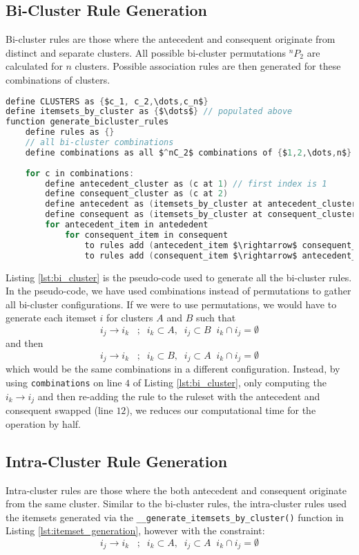 \subsection{Bi-Cluster Rule Generation}
Bi-cluster rules are those where the antecedent and consequent originate from distinct and separate clusters. All possible bi-cluster permutations $^nP_2$ are calculated for $n$ clusters. Possible association rules are then generated for these combinations of clusters.
\begin{lstlisting}[language=C, mathescape=true, caption=Cluster Itemset Generation, label=lst:bi_cluster]
define CLUSTERS as {$c_1, c_2,\dots,c_n$}
define itemsets_by_cluster as {$\dots$} // populated above
function generate_bicluster_rules
    define rules as {}
    // all bi-cluster combinations
    define combinations as all $^nC_2$ combinations of {$1,2,\dots,n$} with 2 elements
    
    for c in combinations:
        define antecedent_cluster as (c at 1) // first index is 1
        define consequent_cluster as (c at 2)
        define antecedent as (itemsets_by_cluster at antecedent_cluster)
        define consequent as (itemsets_by_cluster at consequent_cluster)
        for antecedent_item in antededent
            for consequent_item in consequent
                to rules add (antecedent_item $\rightarrow$ consequent_item)
                to rules add (consequent_item $\rightarrow$ antecedent_item)
\end{lstlisting}
Listing \ref{lst:bi_cluster} is the pseudo-code used to generate all the bi-cluster rules. In the pseudo-code, we have used combinations instead of permutations to gather all bi-cluster configurations. 
If we were to use permutations, we would have to generate each itemset $i$ for clusters $A$ and $B$ such that
	\[i_j \rightarrow i_k\;\;\;;\;\;i_k \subset A,\;\; i_j \subset B\;\; i_k \cap i_j = \emptyset\]
and then
	\[i_j \rightarrow i_k\;\;\;;\;\;i_k \subset B,\;\; i_j \subset A\;\; i_k \cap i_j = \emptyset\]
which would be the same combinations in a different configuration. Instead, by using \texttt{combinations} on line $4$ of Listing \ref{lst:bi_cluster}, only computing the $i_k \rightarrow i_j$ and then re-adding the rule to the ruleset with the antecedent and consequent swapped (line $12$), we reduces our computational time for the operation by half.

\subsection{Intra-Cluster Rule Generation}
Intra-cluster rules are those where the both antecedent and consequent originate from the same cluster. Similar to the bi-cluster rules, the intra-cluster rules used the itemsets generated via the \texttt{\_\_generate\_itemsets\_by\_cluster()} function in Listing \ref{lst:itemset_generation}, however with the constraint:
	\[i_j \rightarrow i_k\;\;\;;\;\;i_k \subset A,\;\; i_j \subset A\;\; i_k \cap i_j = \emptyset\]

